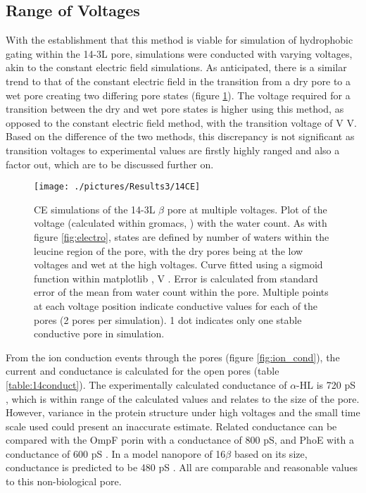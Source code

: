 \subsection*{Range of Voltages}

With the establishment that this method is viable for simulation of hydrophobic gating within the 14-3L pore, simulations were conducted with varying voltages, akin to the constant electric field simulations. As anticipated, there is a similar trend to that of the constant electric field in the transition from a dry pore to a wet pore creating two differing pore states (figure \ref{fig:14CE}). The voltage required for a transition between the dry and wet pore states is higher using this method, as opposed to the constant electric field method, with the transition voltage of V\textsubscript{}  V. Based on the difference of the two methods, this discrepancy is not significant as transition voltages to experimental values are firstly highly ranged and also a factor out, which are to be discussed further on. 

\begin{figure}[H]
\begin{center}
\texttt{[image: ./pictures/Results3/14CE]}
\caption[CE simulations of the 14-3L $\beta$ pore at multiple voltages.] {CE simulations of the 14-3L $\beta$ pore at multiple voltages. Plot of the voltage (calculated within gromacs, \cite{VanderSpoel2013}) with the water count. As with figure \ref{fig:electro}, states are defined by number of waters within the leucine region of the pore, with the dry pores being at the low voltages and wet at the high voltages.  Curve fitted using a sigmoid function within matplotlib \cite{Hunter2007}, V\textsubscript{} . Error is calculated from standard error of the mean from water count within the pore. Multiple points at each voltage position indicate conductive values for each of the pores (2 pores per simulation). 1 dot indicates only one stable conductive pore in simulation.}
\label{fig:14CE}
\end{center}
\end{figure}


From the ion conduction events through the pores (figure \ref{fig:ion_cond}), the current and conductance is calculated for the  open pores (table \ref{table:14conduct}). The experimentally calculated conductance of $\alpha$-HL is 720 pS \cite{Wong2006}, which is within range of the calculated values and relates to the size of the pore. However, variance in the protein structure under high voltages and the small time scale used could present an inaccurate estimate.  Related conductance can be compared with the OmpF porin with a conductance of 800 pS, and PhoE with a conductance of 600 pS \cite{Cowan1992b}. In a model nanopore of 16$\beta$ based on its size, conductance is predicted to be 480 pS \cite{Sansom1995}. All are comparable and reasonable values to this non-biological pore. 

